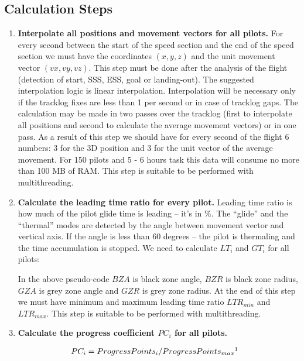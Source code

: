 \documentclass[gap.tex]{subfiles}
\begin{document}
\subsection{Calculation Steps}

\begin{enumerate}
    \item \textbf{Interpolate all positions and movement vectors for all
        pilots.}  For every second between the start of the speed section and
        the end of the speed section we must have the coordinates \((x, y, z)\)
        and the unit movement vector \((vx, vy, vz)\). This step must be done
        after the analysis of the flight (detection of start, SSS, ESS, goal or
        landing-out). The suggested interpolation logic is linear
        interpolation. Interpolation will be necessary only if the tracklog
        fixes are less than 1 per second or in case of tracklog gaps. The
        calculation may be made in two passes over the tracklog (first to
        interpolate all positions and second to calculate the average movement
        vectors) or in one pass. As a result of this step we should have for
        every second of the flight 6 numbers: 3 for the 3D position and 3 for
        the unit vector of the average movement. For 150 pilots and 5 - 6 hours
        task this data will consume no more than 100 MB of RAM. This step is
        suitable to be performed with multithreading.

    \item \textbf{Calculate the leading time ratio for every pilot.} Leading
        time ratio is how much of the pilot glide time is leading – it’s in \%.
        The “glide” and the “thermal” modes are detected by the angle between
        movement vector and vertical axis. If the angle is less than 60 degrees
        – the pilot is thermaling and the time accumulation is stopped. We need
        to calculate \(LT_i\) and \(GT_i\) for all pilots:

        In the above pseudo-code \(BZA\) is black zone angle, \(BZR\) is black
        zone radius, \(GZA\) is grey zone angle and \(GZR\) is grey zone
        radius. At the end of this step we must have minimum and maximum
        leading time ratio \(LTR_{min}\) and \(LTR_{max}\). This step is
        suitable to be performed with multithreading.

    \item \textbf{Calculate the progress coefficient \(PC_i\) for all pilots.}
        
        \begin{align*}
            PC_i &= ProgressPoints_i / ProgressPoints_{max}\footnotemark
        \end{align*}


\end{enumerate}
\end{document}
